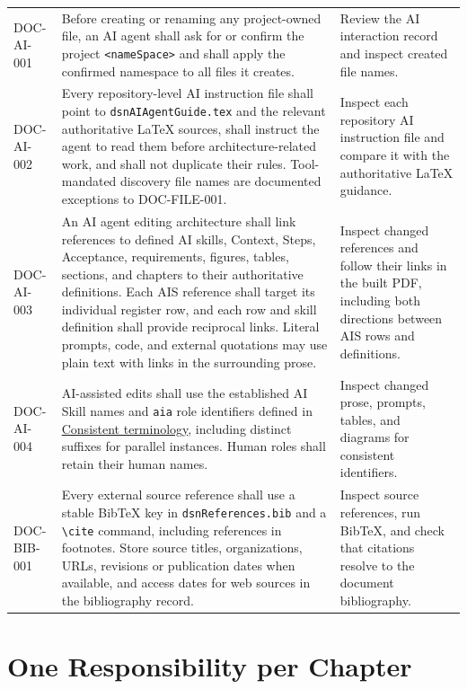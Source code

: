 \begin{tabularx}{\linewidth}{L{2.5cm}Y L{3.0cm}}
DOC-AI-001 & Before creating or renaming any project-owned file, an AI agent
shall ask for or confirm the project \texttt{\textless nameSpace\textgreater}
and shall apply the confirmed namespace to all files it creates. & Review the
AI interaction record and inspect created file names.\\
DOC-AI-002 & Every repository-level AI instruction file shall point to
\texttt{dsnAIAgentGuide.tex} and the relevant authoritative LaTeX sources,
shall instruct the agent to read them before architecture-related work, and
shall not duplicate their rules. Tool-mandated discovery file names are
documented exceptions to DOC-FILE-001. & Inspect each repository AI instruction
file and compare it with the authoritative LaTeX guidance.\\
\label{Requirement:DOCAI003}DOC-AI-003 & An AI agent editing
architecture shall link references to defined AI skills, Context, Steps,
Acceptance, requirements, figures, tables, sections, and chapters to their
authoritative definitions. Each AIS reference shall target its individual
register row, and each row and skill definition shall provide reciprocal links.
Literal prompts, code, and external quotations may use plain text with links
in the surrounding prose. & Inspect changed references and follow their links
in the built PDF, including both directions between AIS rows and definitions.\\
\label{Requirement:DOCAI004}DOC-AI-004 & AI-assisted edits shall use the established AI Skill names and \texttt{aia} role identifiers defined in \hyperref[Rule:AITerminologyConsistency]{Consistent terminology}, including distinct suffixes for parallel instances. Human roles shall retain their human names. & Inspect changed prose, prompts, tables, and diagrams for consistent identifiers.\\
\label{Requirement:DOCBIB001}DOC-BIB-001 & Every external source reference shall use a stable BibTeX key in \texttt{dsnReferences.bib} and a \texttt{\textbackslash cite} command, including references in footnotes. Store source titles, organizations, URLs, revisions or publication dates when available, and access dates for web sources in the bibliography record. & Inspect source references, run BibTeX, and check that citations resolve to the document bibliography.\\
\end{tabularx}
\normalsize

\section{One Responsibility per Chapter}
\label{Section:ChapterResponsibilityConvention}

